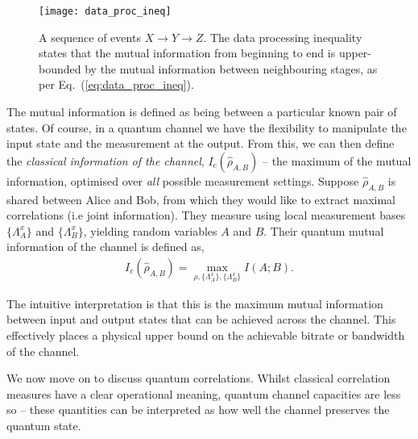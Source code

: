 \begin{figure}[!htbp]
\texttt{[image: data\_proc\_ineq]}
\captionspacefig \caption{\label{fig:data_proc_ineq}A sequence of events \mbox{$X\to Y\to Z$}. The data processing inequality states that the mutual information from beginning to end is upper-bounded by the mutual information between neighbouring stages, as per Eq.~(\ref{eq:data_proc_ineq}).}	
\end{figure}

The mutual information is defined as being between a particular known pair of states. Of course, in a quantum channel we have the flexibility to manipulate the input state and the measurement at the output. From this, we can then define the \textit{classical information of the channel}, $I_c(\hat\rho_{A,B})$ -- the maximum of the mutual information, optimised over \textit{all} possible measurement settings. Suppose $\hat\rho_{A,B}$ is shared between Alice and Bob, from which they would like to extract maximal correlations (i.e joint information). They measure using local measurement bases $\{\Lambda_A^x\}$ and $\{\Lambda_B^x\}$, yielding random variables $A$ and $B$. Their quantum mutual information of the channel is defined as,
\begin{align}
I_c(\hat\rho_{A,B}) = \max_{\rho,\{\Lambda_A^x\},\{\Lambda_B^x\}} I(A;B). \label{eq:quant_mut}
\end{align}

The intuitive interpretation is that this is the maximum mutual information between input and output states that can be achieved across the channel. This effectively places a physical upper bound on the achievable bitrate or bandwidth of the channel.




We now move on to discuss quantum correlations. Whilst classical correlation measures have a clear operational meaning, quantum channel capacities are less so -- these quantities can be interpreted as how well the channel preserves the quantum state.

